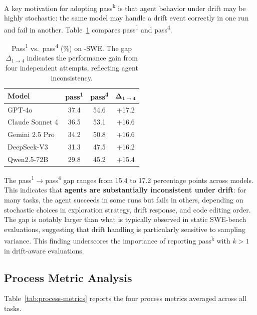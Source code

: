 A key motivation for adopting pass\textsuperscript{k} is that agent behavior under drift may be highly stochastic: the same model may handle a drift event correctly in one run and fail in another. Table~\ref{tab:reliability} compares pass\textsuperscript{1} and pass\textsuperscript{4}.

\begin{table}[t]
\centering
\caption{Pass\textsuperscript{1} vs.\ pass\textsuperscript{4} (\%) on \bench{}-SWE. The gap $\Delta_{1 \to 4}$ indicates the performance gain from four independent attempts, reflecting agent inconsistency.}
\label{tab:reliability}
\small
\begin{tabular}{l cc c}
\toprule
\textbf{Model} & \textbf{pass\textsuperscript{1}} & \textbf{pass\textsuperscript{4}} & $\boldsymbol{\Delta_{1 \to 4}}$ \\
\midrule
GPT-4o          & 37.4 & 54.6 & +17.2 \\
Claude Sonnet 4 & 36.5 & 53.1 & +16.6 \\
Gemini 2.5 Pro  & 34.2 & 50.8 & +16.6 \\
DeepSeek-V3     & 31.3 & 47.5 & +16.2 \\
Qwen2.5-72B     & 29.8 & 45.2 & +15.4 \\
\bottomrule
\end{tabular}
\end{table}

The pass\textsuperscript{1}$\to$pass\textsuperscript{4} gap ranges from 15.4 to 17.2 percentage points across models. This indicates that \textbf{agents are substantially inconsistent under drift}: for many tasks, the agent succeeds in some runs but fails in others, depending on stochastic choices in exploration strategy, drift response, and code editing order. The gap is notably larger than what is typically observed in static SWE-bench evaluations, suggesting that drift handling is particularly sensitive to sampling variance. This finding underscores the importance of reporting pass\textsuperscript{k} with $k > 1$ in drift-aware evaluations.

\subsection{Process Metric Analysis}
\label{sec:process-analysis}

Table~\ref{tab:process-metrics} reports the four process metrics averaged across all tasks.

